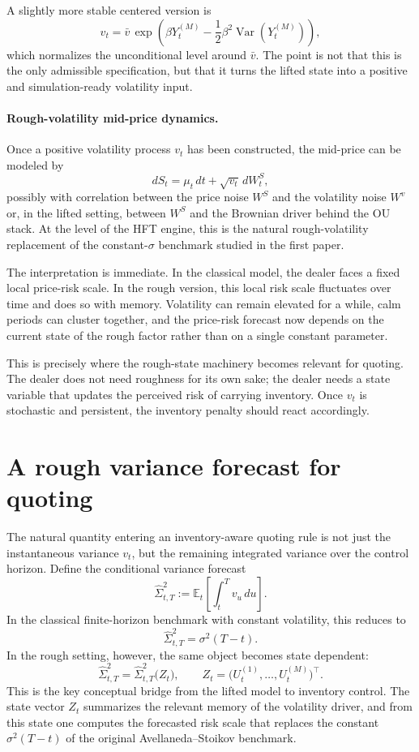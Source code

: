 \documentclass[a4paper,10pt,titlepage,oneside,openany]{book}
\theoremstyle{plain}
\theoremstyle{definition}
\theoremstyle{remark}
\newcommand{\Var}{\operatorname{Var}}
\newcommand{\1}{\mathbf{1}}
\begin{document}
A slightly more stable centered version is
\[
v_t
=
\bar v\,
\exp\!\left(
\beta Y_t^{(M)}
-\frac12\beta^2\Var(Y_t^{(M)})
\right),
\]
which normalizes the unconditional level around \(\bar v\). The point is not that this is the only admissible specification, but that it turns the lifted state into a positive and simulation-ready volatility input.

\paragraph{Rough-volatility mid-price dynamics.}

Once a positive volatility process \(v_t\) has been constructed, the mid-price can be modeled by
\[
dS_t = \mu_t\,dt + \sqrt{v_t}\,dW_t^S,
\]
possibly with correlation between the price noise \(W^S\) and the volatility noise \(W^v\) or, in the lifted setting, between \(W^S\) and the Brownian driver behind the OU stack. At the level of the HFT engine, this is the natural rough-volatility replacement of the constant-\(\sigma\) benchmark studied in the first paper.

The interpretation is immediate. In the classical model, the dealer faces a fixed local price-risk scale. In the rough version, this local risk scale fluctuates over time and does so with memory. Volatility can remain elevated for a while, calm periods can cluster together, and the price-risk forecast now depends on the current state of the rough factor rather than on a single constant parameter.

This is precisely where the rough-state machinery becomes relevant for quoting. The dealer does not need roughness for its own sake; the dealer needs a state variable that updates the perceived risk of carrying inventory. Once \(v_t\) is stochastic and persistent, the inventory penalty should react accordingly.

\section{A rough variance forecast for quoting}

The natural quantity entering an inventory-aware quoting rule is not just the instantaneous variance \(v_t\), but the remaining integrated variance over the control horizon. Define the conditional variance forecast
\[
\widehat{\Sigma}_{t,T}^2
:=
\mathbb{E}_t\!\left[\int_t^T v_u\,du\right].
\]
In the classical finite-horizon benchmark with constant volatility, this reduces to
\[
\widehat{\Sigma}_{t,T}^2 = \sigma^2(T-t).
\]
In the rough setting, however, the same object becomes state dependent:
\[
\widehat{\Sigma}_{t,T}^2
=
\widehat{\Sigma}_{t,T}^2\bigl(Z_t\bigr),
\qquad
Z_t=\bigl(U_t^{(1)},\dots,U_t^{(M)}\bigr)^\top.
\]
This is the key conceptual bridge from the lifted model to inventory control. The state vector \(Z_t\) summarizes the relevant memory of the volatility driver, and from this state one computes the forecasted risk scale that replaces the constant \(\sigma^2(T-t)\) of the original Avellaneda--Stoikov benchmark.
\end{document}
